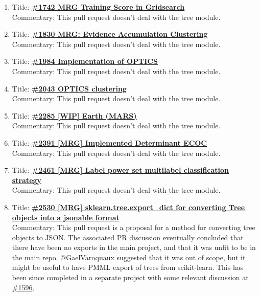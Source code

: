 \documentclass[12pt, oneside]{article}
\begin{document}
\begin{enumerate}
  \item 
  Title:
  \textbf{\href{https://github.com/scikit-learn/scikit-learn/pull/1742}
    {\#1742 MRG Training Score in Gridsearch}}\\
  Commentary: This pull request doesn't deal with the tree module.

  \item 
  Title:
  \textbf{\href{https://github.com/scikit-learn/scikit-learn/pull/1830}
    {\#1830 MRG: Evidence Accumulation Clustering}}\\
  Commentary: This pull request doesn't deal with the tree module.

  \item 
  Title:
  \textbf{\href{https://github.com/scikit-learn/scikit-learn/pull/1984}
    {\#1984 Implementation of OPTICS}}\\
  Commentary: This pull request doesn't deal with the tree module.

  \item 
  Title:
  \textbf{\href{https://github.com/scikit-learn/scikit-learn/pull/2043}
    {\#2043 OPTICS clustering}}\\
  Commentary: This pull request doesn't deal with the tree module.

  \item 
  Title:
  \textbf{\href{https://github.com/scikit-learn/scikit-learn/pull/2285}
    {\#2285 [WIP] Earth (MARS)}}\\
  Commentary: This pull request doesn't deal with the tree module.
  
  \item 
  Title:
  \textbf{\href{https://github.com/scikit-learn/scikit-learn/pull/2391}
    {\#2391 [MRG] Implemented Determinant ECOC}}\\
  Commentary: This pull request doesn't deal with the tree module.

  \item 
  Title:
  \textbf{\href{https://github.com/scikit-learn/scikit-learn/pull/2461}
    {\#2461 [MRG] Label power set multilabel classification strategy}}\\
  Commentary: This pull request doesn't deal with the tree module.

  \item 
  Title:
  \textbf{\href{https://github.com/scikit-learn/scikit-learn/pull/2530}
    {\#2530 [MRG] sklearn.tree.export\_dict for converting Tree
      objects into a jsonable format}}\\
  Commentary: This pull request is a proposal for a method for
  converting tree objects to JSON. The associated PR discussion
  eventually concluded that there have been no exports in the main
  project, and that it was unfit to be in the main
  repo. @GaelVaroquaux suggested that it was out of scope, but it
  might be useful to have PMML export of trees from scikit-learn. This
  has been since completed in a separate project with some relevant
  discussion at
  \href{https://github.com/scikit-learn/scikit-learn/issues/1596}{\#1596}.


\end{enumerate}
\end{document}
